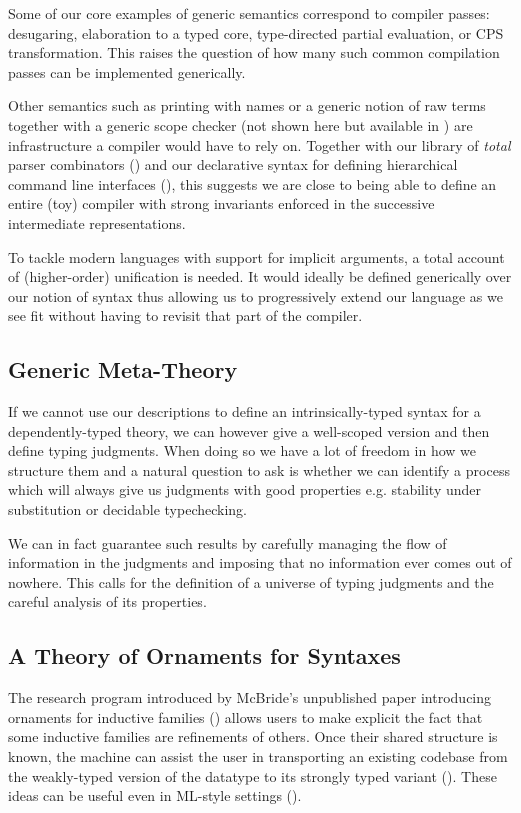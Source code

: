 Some of our core examples of generic semantics correspond to compiler passes:
desugaring, elaboration to a typed core, type-directed partial evaluation,
or CPS transformation. This raises the question of how many such common
compilation passes can be implemented generically.

Other semantics such as printing with names or a generic notion of raw terms
together with a generic scope checker (not shown here but available in
\cite{repo2018})
are infrastructure a compiler would have to rely on. Together with our library
of \emph{total} parser combinators (\cite{allais2018agdarsec}) and our
declarative
syntax for defining hierarchical command line interfaces (\cite{allaisagdargs}),
this suggests we are close to being able to define an entire (toy) compiler with
strong invariants enforced in the successive intermediate representations.

To tackle modern languages with support for implicit arguments, a total account
of (higher-order) unification is needed. It would ideally be defined generically
over our notion of syntax thus allowing us to progressively extend our language
as we see fit without having to revisit that part of the compiler.

\subsection{Generic Meta-Theory}

If we cannot use our descriptions to define an intrinsically-typed syntax for
a dependently-typed theory, we can however give a well-scoped version and then
define typing judgments. When doing so we have a lot of freedom in how we
structure them and a natural question to ask is whether we can identify a
process which will always give us judgments with good properties e.g.
stability under substitution or decidable typechecking.

We can in fact guarantee such results by carefully managing the flow of
information in the judgments and imposing that no information ever comes
out of nowhere. This calls for the definition of a universe of typing
judgments and the careful analysis of its properties.

\subsection{A Theory of Ornaments for Syntaxes}

The research program introduced by McBride's unpublished paper introducing
ornaments for inductive families (\citeyear{mcbride2010ornamental}) allows users
to make explicit the fact that some inductive families are refinements of
others.
Once their shared structure is known, the machine can assist the user in
transporting an existing codebase from the weakly-typed version of the datatype
to its strongly typed variant (\cite{dagand_mcbride_2014}). These ideas can be
useful even in ML-style settings (\cite{Williams:2014:OP:2633628.2633631}).

